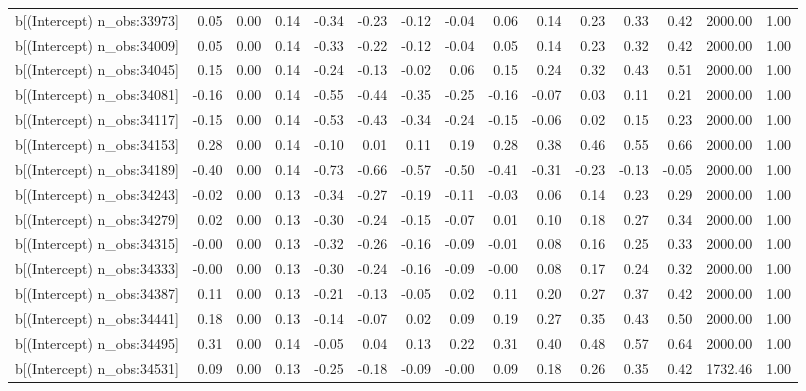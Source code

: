\begin{table}[ht]
\begin{tabular}{rrrrrrrrrrrrrrr}
  b[(Intercept) n\_obs:33973] & 0.05 & 0.00 & 0.14 & -0.34 & -0.23 & -0.12 & -0.04 & 0.06 & 0.14 & 0.23 & 0.33 & 0.42 & 2000.00 & 1.00 \\ 
  b[(Intercept) n\_obs:34009] & 0.05 & 0.00 & 0.14 & -0.33 & -0.22 & -0.12 & -0.04 & 0.05 & 0.14 & 0.23 & 0.32 & 0.42 & 2000.00 & 1.00 \\ 
  b[(Intercept) n\_obs:34045] & 0.15 & 0.00 & 0.14 & -0.24 & -0.13 & -0.02 & 0.06 & 0.15 & 0.24 & 0.32 & 0.43 & 0.51 & 2000.00 & 1.00 \\ 
  b[(Intercept) n\_obs:34081] & -0.16 & 0.00 & 0.14 & -0.55 & -0.44 & -0.35 & -0.25 & -0.16 & -0.07 & 0.03 & 0.11 & 0.21 & 2000.00 & 1.00 \\ 
  b[(Intercept) n\_obs:34117] & -0.15 & 0.00 & 0.14 & -0.53 & -0.43 & -0.34 & -0.24 & -0.15 & -0.06 & 0.02 & 0.15 & 0.23 & 2000.00 & 1.00 \\ 
  b[(Intercept) n\_obs:34153] & 0.28 & 0.00 & 0.14 & -0.10 & 0.01 & 0.11 & 0.19 & 0.28 & 0.38 & 0.46 & 0.55 & 0.66 & 2000.00 & 1.00 \\ 
  b[(Intercept) n\_obs:34189] & -0.40 & 0.00 & 0.14 & -0.73 & -0.66 & -0.57 & -0.50 & -0.41 & -0.31 & -0.23 & -0.13 & -0.05 & 2000.00 & 1.00 \\ 
  b[(Intercept) n\_obs:34243] & -0.02 & 0.00 & 0.13 & -0.34 & -0.27 & -0.19 & -0.11 & -0.03 & 0.06 & 0.14 & 0.23 & 0.29 & 2000.00 & 1.00 \\ 
  b[(Intercept) n\_obs:34279] & 0.02 & 0.00 & 0.13 & -0.30 & -0.24 & -0.15 & -0.07 & 0.01 & 0.10 & 0.18 & 0.27 & 0.34 & 2000.00 & 1.00 \\ 
  b[(Intercept) n\_obs:34315] & -0.00 & 0.00 & 0.13 & -0.32 & -0.26 & -0.16 & -0.09 & -0.01 & 0.08 & 0.16 & 0.25 & 0.33 & 2000.00 & 1.00 \\ 
  b[(Intercept) n\_obs:34333] & -0.00 & 0.00 & 0.13 & -0.30 & -0.24 & -0.16 & -0.09 & -0.00 & 0.08 & 0.17 & 0.24 & 0.32 & 2000.00 & 1.00 \\ 
  b[(Intercept) n\_obs:34387] & 0.11 & 0.00 & 0.13 & -0.21 & -0.13 & -0.05 & 0.02 & 0.11 & 0.20 & 0.27 & 0.37 & 0.42 & 2000.00 & 1.00 \\ 
  b[(Intercept) n\_obs:34441] & 0.18 & 0.00 & 0.13 & -0.14 & -0.07 & 0.02 & 0.09 & 0.19 & 0.27 & 0.35 & 0.43 & 0.50 & 2000.00 & 1.00 \\ 
  b[(Intercept) n\_obs:34495] & 0.31 & 0.00 & 0.14 & -0.05 & 0.04 & 0.13 & 0.22 & 0.31 & 0.40 & 0.48 & 0.57 & 0.64 & 2000.00 & 1.00 \\ 
  b[(Intercept) n\_obs:34531] & 0.09 & 0.00 & 0.13 & -0.25 & -0.18 & -0.09 & -0.00 & 0.09 & 0.18 & 0.26 & 0.35 & 0.42 & 1732.46 & 1.00 \\ 

\end{tabular}
\end{table}
